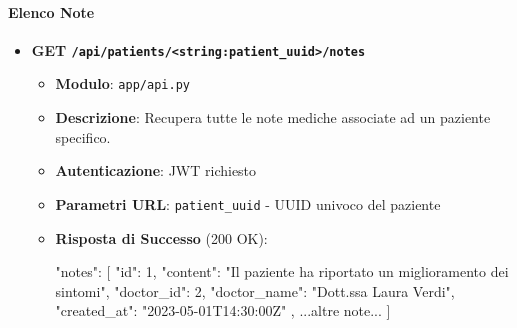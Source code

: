 \documentclass[12pt,a4paper,oneside]{report}
\begin{document}
\paragraph{Elenco Note}
\begin{itemize}
    \item \textbf{GET \texttt{/api/patients/<string:patient\_uuid>/notes}}
          \begin{itemize}
              \item \textbf{Modulo}: \texttt{app/api.py}
              \item \textbf{Descrizione}: Recupera tutte le note mediche associate ad un paziente specifico.
              \item \textbf{Autenticazione}: JWT richiesto
              \item \textbf{Parametri URL}: \texttt{patient\_uuid} - UUID univoco del paziente
              \item \textbf{Risposta di Successo} (200 OK):
                    \begin{spverbatim}
                        {
                        "notes": [
                        {
                                "id": 1,
                                "content": "Il paziente ha riportato un miglioramento dei sintomi",
                                "doctor_id": 2,
                                "doctor_name": "Dott.ssa Laura Verdi",
                                "created_at": "2023-05-01T14:30:00Z"
                            },
                        ...altre note...
                        ]
                        }
                    \end{spverbatim}
          \end{itemize}
\end{itemize}
\end{document}
